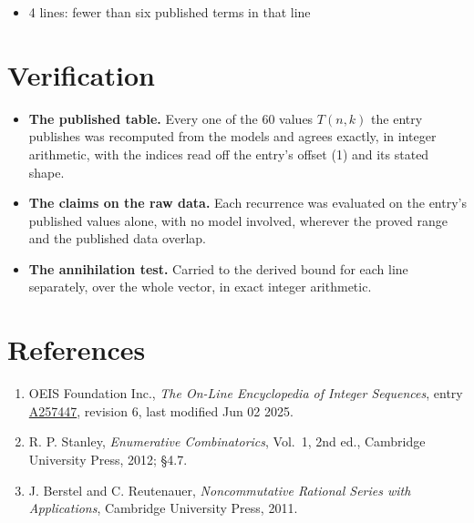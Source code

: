 \documentclass[11pt]{article}
\theoremstyle{definition}
\begin{document}
\begin{itemize}

\item 4 lines: fewer than six published terms in that line

\end{itemize}

\section{Verification}

\begin{itemize}

\item {\bfseries The published table.} Every one of the 60 values $T(n,k)$ the entry publishes was recomputed from the models and agrees exactly, in integer arithmetic, with the indices read off the entry's offset (1) and its stated shape.

\item {\bfseries The claims on the raw data.} Each recurrence was evaluated on the entry's published values alone, with no model involved, wherever the proved range and the published data overlap.

\item {\bfseries The annihilation test.} Carried to the derived bound for each line separately, over the whole vector, in exact integer arithmetic.

\end{itemize}

\section{References}

\begin{enumerate}

\item OEIS Foundation Inc., \emph{The On-Line Encyclopedia of Integer Sequences}, entry \href{https://oeis.org/A257447}{A257447}, revision 6, last modified Jun 02 2025.

\item R. P. Stanley, \emph{Enumerative Combinatorics}, Vol.~1, 2nd ed., Cambridge University Press, 2012; \S4.7.

\item J. Berstel and C. Reutenauer, \emph{Noncommutative Rational Series with Applications}, Cambridge University Press, 2011.

\end{enumerate}
\end{document}
